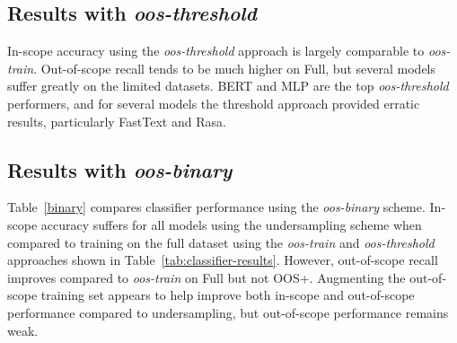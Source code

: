 \documentclass[11pt,a4paper]{article}
\begin{document}
\subsection{Results with \emph{oos-threshold}}
In-scope accuracy using the \emph{oos-threshold} approach is largely comparable to \emph{oos-train}. Out-of-scope recall tends to be much higher on Full, but several models suffer greatly on the limited datasets. BERT and MLP are the top \emph{oos-threshold} performers, and for several models the threshold approach provided erratic results, particularly FastText and Rasa.



\subsection{Results with \emph{oos-binary}}
Table~\ref{binary} compares classifier performance using the \emph{oos-binary} scheme. In-scope accuracy suffers for all models using the undersampling scheme when compared to training on the full dataset using the \emph{oos-train} and \emph{oos-threshold} approaches shown in Table~\ref{tab:classifier-results}. However, out-of-scope recall improves compared to \emph{oos-train} on Full but not OOS+. Augmenting the out-of-scope training set appears to help improve both in-scope and out-of-scope performance compared to undersampling, but out-of-scope performance remains weak.

\begin{table}[t]
\begin{center}
\end{center}
\caption{\label{binary}
Results of \emph{oos-binary} experiments on OOS+, where we compare performance of undersampling (under) and augmentation using sentences from Wikipedia (wiki aug). The wiki aug approach was too large for the DialogFlow and Rasa classifiers.
}
\end{table}
\end{document}
